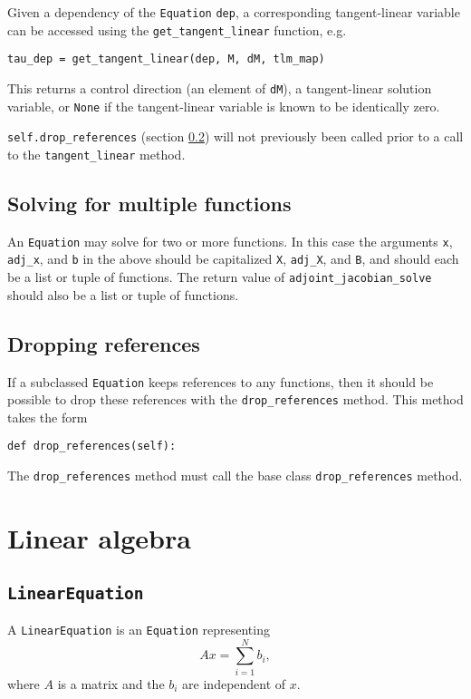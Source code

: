 \documentclass[11pt]{article}
\begin{document}
Given a dependency of the \texttt{Equation} \texttt{dep}, a corresponding
tangent-linear variable can be accessed using the \texttt{get\_tangent\_linear}
function, e.g.
\begin{lstlisting}
tau_dep = get_tangent_linear(dep, M, dM, tlm_map)
\end{lstlisting}
This returns a control direction (an element of \texttt{dM}), a tangent-linear
solution variable, or \texttt{None} if the tangent-linear variable is known to
be identically zero.

\texttt{self.drop\_references} (section \ref{sect:drop_references}) will not
previously been called prior to a call to the \texttt{tangent\_linear} method.

\subsection{Solving for multiple functions}

An \texttt{Equation} may solve for two or more functions. In this case the
arguments \texttt{x}, \texttt{adj\_x}, and \texttt{b} in the above should be
capitalized \texttt{X}, \texttt{adj\_X}, and \texttt{B}, and should each be a
list or tuple of functions. The return value of
\texttt{adjoint\_jacobian\_solve} should also be a list or tuple of functions.

\subsection{Dropping references}\label{sect:drop_references}

If a subclassed \texttt{Equation} keeps references to any functions, then it
should be possible to drop these references with the \texttt{drop\_references}
method. This method takes the form
\begin{lstlisting}
def drop_references(self):
\end{lstlisting}
The \texttt{drop\_references} method must call the base class
\texttt{drop\_references} method.

\section{Linear algebra}

\subsection{\texttt{LinearEquation}}

A \texttt{LinearEquation} is an \texttt{Equation} representing
\begin{equation*}
  A x = \sum_{i = 1}^N b_i,
\end{equation*}
where $A$ is a matrix and the $b_i$ are independent of $x$.
\end{document}
